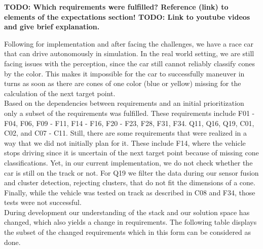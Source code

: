 \textbf{TODO: Which requirements were fulfilled? Reference (link) to elements of the expectations section! TODO: Link to youtube videos and give brief explanation.}

Following for implementation and after facing the challenges, we have a race car that can drive autonomously in simulation. In the real world setting, we are still facing issues with the perception, since the car still cannot reliably classify cones by the color. This makes it impossible for the car to successfully maneuver in turns as soon as there are cones of one color (blue or yellow) missing for the calculation of the next target point. \\ \newline
Based on the dependencies between requirements and an initial prioritization  only a subset of the requirements was fulfilled. These requirements include F01 - F04, F06, F09 - F11, F14 - F16, F20 - F23, F28, F31, F34. Q11, Q16, Q19, C01, C02, and C07 - C11. Still, there are some requirements that were realized in a way that we did not initially plan for it. These include F14, where the vehicle stops driving since it is uncertain of the next target point because of missing cone classifications. Yet, in our current implementation, we do not check whether the car is still on the track or not. For Q19 we filter the data during our sensor fusion and cluster detection, rejecting clusters, that do not fit the dimensions of a cone. Finally, while the vehicle was tested on track as described in C08 and F34, those tests were not successful. \\
\newline
During development our understanding of the stack and our solution space has changed, which also yields a change in requirements. The following table displays the subset of the changed requirements which in this form can be considered as done. \\

